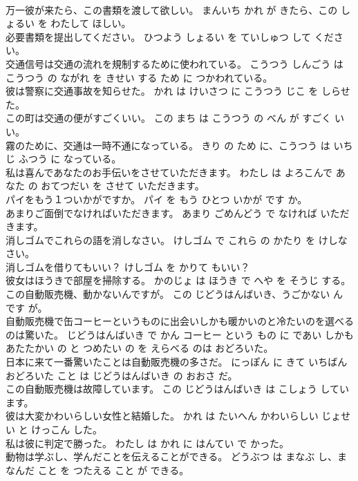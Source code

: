 \documentclass[8pt]{extreport}
\begin{document}
\begin{CJK}{UTF8}{min}
\\	万一彼が来たら、この書類を渡して欲しい。	まんいち かれ が きたら、この しょるい を わたして ほしい。	
\\	必要書類を提出してください。	ひつよう しょるい を ていしゅつ して ください。	
\\	交通信号は交通の流れを規制するために使われている。	こうつう しんごう は こうつう の ながれ を きせい する ため に つかわれている。	
\\	彼は警察に交通事故を知らせた。	かれ は けいさつ に こうつう じこ を しらせた。	
\\	この町は交通の便がすごくいい。	この まち は こうつう の べん が すごく いい。	
\\	霧のために、交通は一時不通になっている。	きり の ため に、こうつう は いちじ ふつう に なっている。	
\\	私は喜んであなたのお手伝いをさせていただきます。	わたし は よろこんで あなた の おてつだい を させて いただきます。	
\\	パイをもう１ついかがですか。	パイ を もう ひとつ いかが です か。	
\\	あまりご面倒でなければいただきます。	あまり ごめんどう で なければ いただきます。	
\\	消しゴムでこれらの語を消しなさい。	けしゴム で これら の かたり を けしなさい。	
\\	消しゴムを借りてもいい？	けしゴム を かりて もいい？	
\\	彼女はほうきで部屋を掃除する。	かのじょ は ほうき で へや を そうじ する。	
\\	この自動販売機、動かないんですが。	この じどうはんばいき、うごかない ん です が。	
\\	自動販売機で缶コーヒーというものに出会いしかも暖かいのと冷たいのを選べるのは驚いた。	じどうはんばいき で かん コーヒー という もの に であい しかも あたたかい の と つめたい の を えらべる のは おどろいた。	
\\	日本に来て一番驚いたことは自動販売機の多さだ。	にっぽん に きて いちばん おどろいた こと は じどうはんばいき の おおさ だ。	
\\	この自動販売機は故障しています。	この じどうはんばいき は こしょう しています。	
\\	彼は大変かわいらしい女性と結婚した。	かれ は たいへん かわいらしい じょせい と けっこん した。	
\\	私は彼に判定で勝った。	わたし は かれ に はんてい で かった。	
\\	動物は学ぶし、学んだことを伝えることができる。	どうぶつ は まなぶ し、まなんだ こと を つたえる こと が できる。	

\end{CJK}
\end{document}
